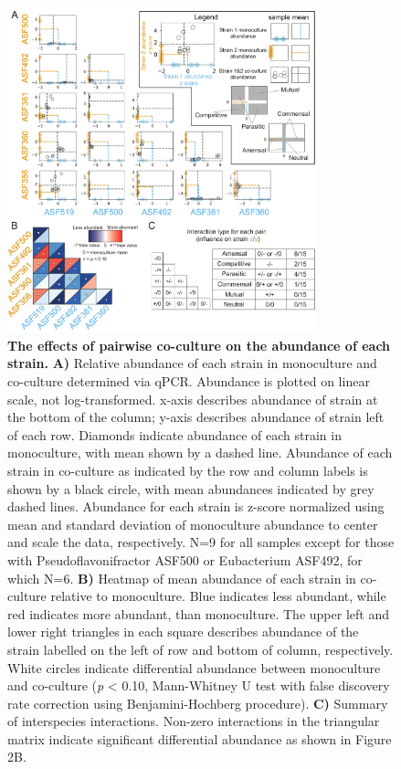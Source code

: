 \documentclass[11pt,twocolumn,notitlepage,openany,twoside]{book}
\begin{document}
\begin{figure}
\centering
\includegraphics[width=0.8\textwidth]{ch2_fig2}
\caption[The effects of pairwise co-culture on the abundance of each strain.]{\textbf{The effects of pairwise co-culture on the abundance of each strain.} \textbf{A)} Relative abundance of each strain in monoculture and co-culture determined via qPCR. Abundance is plotted on linear scale, not log-transformed. x-axis describes abundance of strain at the bottom of the column; y-axis describes abundance of strain left of each row. Diamonds indicate abundance of each strain in monoculture, with mean shown by a dashed line. Abundance of each strain in co-culture as indicated by the row and column labels is shown by a black circle, with mean abundances indicated by grey dashed lines. Abundance for each strain is z-score normalized using mean and standard deviation of monoculture abundance to center and scale the data, respectively. N=9 for all samples except for those with Pseudoflavonifractor ASF500 or Eubacterium ASF492, for which N=6. \textbf{B)} Heatmap of mean abundance of each strain in co-culture relative to monoculture. Blue indicates less abundant, while red indicates more abundant, than monoculture. The upper left and lower right triangles in each square describes abundance of the strain labelled on the left of row and bottom of column, respectively. White circles indicate differential abundance between monoculture and co-culture (\textit{p} < 0.10, Mann-Whitney U test with false discovery rate correction using Benjamini-Hochberg procedure). \textbf{C)} Summary of interspecies interactions. Non-zero interactions in the triangular matrix indicate significant differential abundance as shown in Figure 2B.}
\end{figure}
\end{document}
